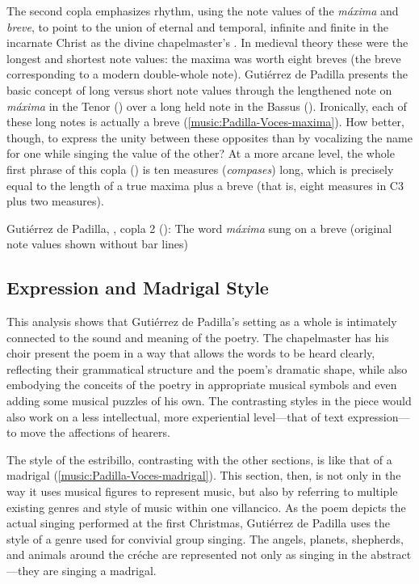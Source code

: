 The second copla emphasizes rhythm, using the note values of the \emph{máxima}
and \emph{breve}, to point to the union of eternal and temporal, infinite and
finite in the incarnate Christ as the divine chapelmaster's
.
In medieval theory these were the longest and shortest note values: the maxima
was worth eight breves (the breve corresponding to a modern double-whole note).
Gutiérrez de Padilla presents the basic concept of long versus short note values
through the lengthened note on \emph{máxima} in the Tenor ()
over a long held note in the Bassus ().
Ironically, each of these long notes is actually a breve
(\cref{music:Padilla-Voces-maxima}).
How better, though, to express the unity between these opposites than by
vocalizing the name for one while singing the value of the other?
At a more arcane level, the whole first phrase of this copla
() is ten measures (\emph{compases}) long, which is precisely
equal to the length of a true maxima plus a breve (that is, eight measures in C3
plus two measures).

\begin{musicexample}
    \caption{Gutiérrez de Padilla, , copla 2
    (): The word \emph{máxima} sung on a breve (original note
    values shown without bar lines)}
  
    \label{music:Padilla-Voces-maxima}
\end{musicexample}


\subsection{Expression and Madrigal Style}

This analysis shows that Gutiérrez de Padilla's setting as a whole is intimately
connected to the sound and meaning of the poetry.
The chapelmaster has his choir present the poem in a way that allows the words
to be heard clearly, reflecting their grammatical structure and the poem's
dramatic shape, while also embodying the conceits of the poetry in appropriate
musical symbols and even adding some musical puzzles of his own.
The contrasting styles in the piece would also work on a less intellectual, more
experiential level---that of text expression---to move the affections of
hearers.

The style of the estribillo, contrasting with the other sections, is like that
of a madrigal (\cref{music:Padilla-Voces-madrigal}).
This section, then, is  not only in the way it uses
musical figures to represent music, but also by referring to multiple existing
genres and style of music within one villancico.
As the poem depicts the actual singing performed at the first Christmas,
Gutiérrez de Padilla uses the style of a genre used for convivial group singing.
The angels, planets, shepherds, and animals around the créche are represented
not only as singing in the abstract---they are singing a madrigal.

